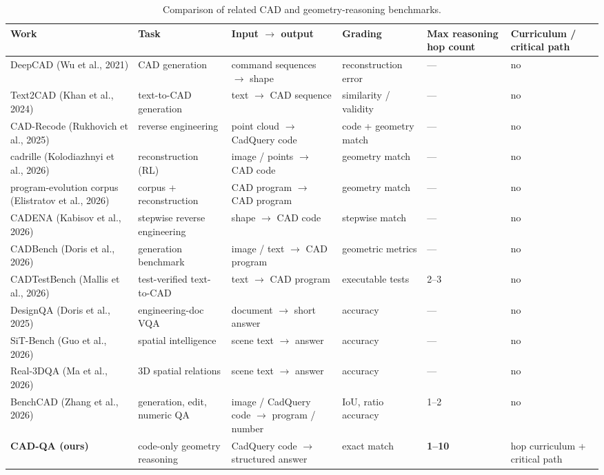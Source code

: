 \documentclass[10pt]{article}
\begin{document}
\begin{table}[h]
\centering
\small
\setlength{\tabcolsep}{4pt}
\caption{Comparison of related CAD and geometry-reasoning benchmarks.}
\label{tab:related}
\begin{tabular}{p{2.2cm}p{2.2cm}p{3.4cm}p{2.2cm}p{1.7cm}p{2.3cm}}
\hline
Work & Task & Input $\to$ output & Grading & Max reasoning hop count & Curriculum / critical path \\
\hline
DeepCAD (Wu et al., 2021) & CAD generation & command sequences $\to$ shape & reconstruction error & --- & no \\
Text2CAD (Khan et al., 2024) & text-to-CAD generation & text $\to$ CAD sequence & similarity / validity & --- & no \\
CAD-Recode (Rukhovich et al., 2025) & reverse engineering & point cloud $\to$ CadQuery code & code + geometry match & --- & no \\
cadrille (Kolodiazhnyi et al., 2026) & reconstruction (RL) & image / points $\to$ CAD code & geometry match & --- & no \\
program-evolution corpus (Elistratov et al., 2026) & corpus + reconstruction & CAD program $\to$ CAD program & geometry match & --- & no \\
CADENA (Kabisov et al., 2026) & stepwise reverse engineering & shape $\to$ CAD code & stepwise match & --- & no \\
CADBench (Doris et al., 2026) & generation benchmark & image / text $\to$ CAD program & geometric metrics & --- & no \\
CADTestBench (Mallis et al., 2026) & test-verified text-to-CAD & text $\to$ CAD program & executable tests & 2--3 & no \\
DesignQA (Doris et al., 2025) & engineering-doc VQA & document $\to$ short answer & accuracy & --- & no \\
SiT-Bench (Guo et al., 2026) & spatial intelligence & scene text $\to$ answer & accuracy & --- & no \\
Real-3DQA (Ma et al., 2026) & 3D spatial relations & scene text $\to$ answer & accuracy & --- & no \\
BenchCAD (Zhang et al., 2026) & generation, edit, numeric QA & image / CadQuery code $\to$ program / number & IoU, ratio accuracy & 1--2 & no \\
\textbf{CAD-QA (ours)} & code-only geometry reasoning & CadQuery code $\to$ structured answer & exact match & \textbf{1--10} & hop curriculum + critical path \\
\hline
\end{tabular}
\end{table}
\end{document}
